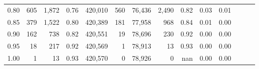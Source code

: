 \begin{tabular}{rrrrrrrrrrrrrr}
0.80 &      605 &  1,872 &  0.76 &  420,010 &      560 &  76,436 &   2,490 &  0.82 &  0.03 &      0.01 \\
0.85 &      379 &  1,522 &  0.80 &  420,389 &      181 &  77,958 &     968 &  0.84 &  0.01 &      0.00 \\
0.90 &      162 &    738 &  0.82 &  420,551 &       19 &  78,696 &     230 &  0.92 &  0.00 &      0.00 \\
0.95 &       18 &    217 &  0.92 &  420,569 &        1 &  78,913 &      13 &  0.93 &  0.00 &      0.00 \\
1.00 &        1 &     13 &  0.93 &  420,570 &        0 &  78,926 &       0 &   nan &  0.00 &      0.00 \\
\bottomrule
\end{tabular}
